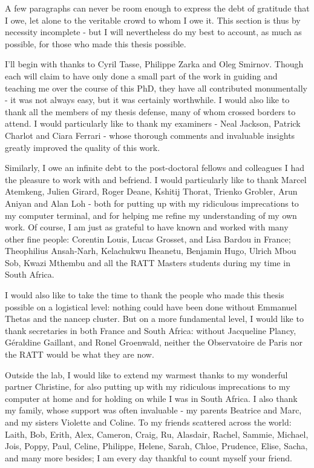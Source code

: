 \pg
A few paragraphs can never be room enough to express the debt of gratitude that I owe, let alone to the veritable crowd to whom I owe it. This section is thus by necessity incomplete - but I will nevertheless do my best to account, as much as possible, for those who made this thesis possible.

\pg
I'll begin with thanks to Cyril Tasse, Philippe Zarka and Oleg Smirnov. Though each will claim to have only done a small part of the work in guiding and teaching me over the course of this PhD, they have all contributed monumentally - it was not always easy, but it was certainly worthwhile. I would also like to thank all the members of my thesis defense, many of whom crossed borders to attend. I would particularly like to thank my examiners - Neal Jackson, Patrick Charlot and Ciara Ferrari - whose thorough comments and invaluable insights greatly improved the quality of this work.

\pg
Similarly, I owe an infinite debt to the post-doctoral fellows and colleagues I had the pleasure to work with and befriend. I would particularly like to thank Marcel Atemkeng, Julien Girard, Roger Deane, Kshitij Thorat, Trienko Grobler, Arun Aniyan and Alan Loh - both for putting up with my ridiculous imprecations to my computer terminal, and for helping me refine my understanding of my own work. Of course, I am just as grateful to have known and worked with many other fine people: Corentin Louis, Lucas Grosset, and Lisa Bardou in France; Theophilius Ansah-Narh, Kelachukwu Iheanetu, Benjamin Hugo, Ulrich Mbou Sob, Kwazi Mthembu and all the RATT Masters students during my time in South Africa.

\pg
I would also like to take the time to thank the people who made this thesis possible on a logistical level: nothing could have been done without Emmanuel Thetas and the nancep cluster. But on a more fundamental level, I would like to thank secretaries in both France and South Africa: without Jacqueline Plancy, Géraldine Gaillant, and Ronel Groenwald, neither the Observatoire de Paris nor the RATT would be what they are now.

\pg
Outside the lab, I would like to extend my warmest thanks to my wonderful partner Christine, for also putting up with my ridiculous imprecations to my computer at home and for holding on while I was in South Africa. I also thank my family, whose support was often invaluable - my parents Beatrice and Marc, and my sisters Violette and Coline. To my friends scattered across the world: Laith, Bob, Erith, Alex, Cameron, Craig, Ru, Alasdair, Rachel, Sammie, Michael, Jois, Poppy, Paul, Celine, Philippe, Helene, Sarah, Chloe, Prudence, Elise, Sacha, and many more besides; I am every day thankful to count myself your friend.

